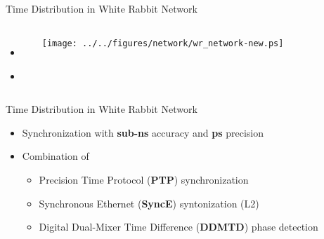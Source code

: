 \documentclass[compress,red]{beamer}
\begin{document}
\subsection{}
\begin{frame}{Time Distribution in White Rabbit Network}


\begin{columns}[c]
 
  \begin{itemize}
    \item \textbf{\color{blue!90}{High accuracy/precision synchronization}}
    \item \color{gray}{Deterministic, reliable and low-latency Control Data delivery}
  \end{itemize}

    \begin{center}
    \texttt{[image: ../../figures/network/wr\_network-new.ps]}
    \end{center}
\end{columns}

\end{frame}
\begin{frame}{Time Distribution in White Rabbit Network}

  \begin{itemize}
    \item Synchronization with {\bf sub-ns} accuracy and {\bf ps} precision
    \item Combination of
	\begin{itemize}
	  \item Precision Time Protocol ({\bf PTP}) synchronization
	  \item Synchronous Ethernet ({\bf SyncE}) syntonization (L2)
	  \item Digital Dual-Mixer Time Difference ({\bf DDMTD}) phase detection
	\end{itemize}
  \end{itemize}
\end{frame}
\end{document}

